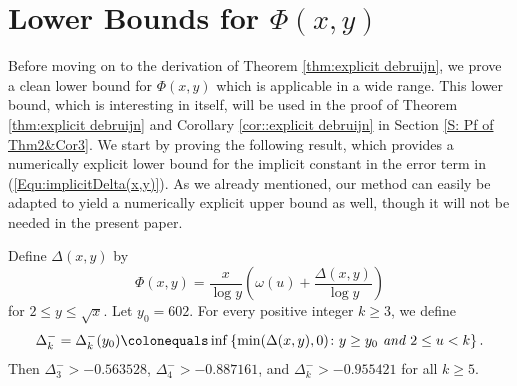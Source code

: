 \documentclass[12pt,reqno]{amsart}
\begin{document}
\section{Lower Bounds for $\Phi(x,y)$}\label{S:0.4Inequ}
Before moving on to the derivation of Theorem \ref{thm:explicit debruijn}, we prove a clean lower bound for $\Phi(x,y)$ which is applicable in a wide range. This lower bound, which is interesting in itself, will be used in the proof of Theorem \ref{thm:explicit debruijn} and Corollary \ref{cor::explicit debruijn} in Section \ref{S: Pf of Thm2&Cor3}. We start by proving the following result, which provides a numerically explicit lower bound for the implicit constant in the error term in (\ref{Equ:implicitDelta(x,y)}). As we already mentioned, our method can easily be adapted to yield a numerically explicit upper bound as well, though it will not be needed in the present paper.
\begin{prop}\label{Prop:LBDelta(x,y)}
Define $\Delta(x,y)$ by
\[\Phi(x,y)=\frac{x}{\log y}\left(\omega(u)+\frac{\Delta(x,y)}{\log y}\right)\]
for $2\le y\le \sqrt{x}$. Let $y_0=602$. For every positive integer $k\ge3$, we define
\[\Delta_k^-=\Delta_k^-(y_0)\colonequals\inf\left\{\min(\Delta(x,y),0)\colon y\ge y_0\emph{~and~}2\le u<k\right\}.\]
Then $\Delta_3^->-0.563528$, $\Delta_4^->-0.887161$, and $\Delta_k^->-0.955421$ for all $k\ge5$.
\end{prop}
\end{document}
